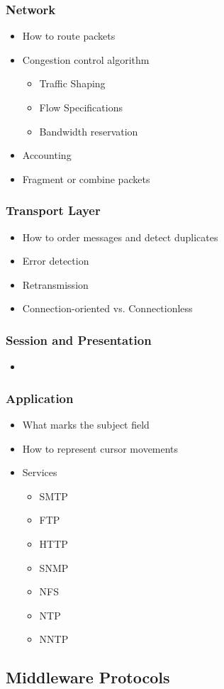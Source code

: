 \subsubsection{Network}\label{subsubsec:Network_Protocols}
\begin{itemize}
\item How to route packets
\item Congestion control algorithm
  \begin{itemize}
  \item Traffic Shaping
  \item Flow Specifications
  \item Bandwidth reservation
  \end{itemize}
\item Accounting
\item Fragment or combine packets
\end{itemize}

\subsubsection{Transport Layer}\label{subsubsec:Transport_Layer_Protocols}
\begin{itemize}
\item How to order messages and detect duplicates
\item Error detection
\item Retransmission
\item Connection-oriented vs. Connectionless
\end{itemize}

\subsubsection{Session and Presentation}\label{subsubsec:Session_Presentation_Protocols}
\begin{itemize}
\item
\end{itemize}

\subsubsection{Application}\label{subsubsec:Application_Protocols}
\begin{itemize}
\item What marks the subject field
\item How to represent cursor movements
\item Services
  \begin{itemize}
  \item SMTP
  \item FTP
  \item HTTP
  \item SNMP
  \item NFS
  \item NTP
  \item NNTP
  \end{itemize}
\end{itemize}

\subsection{Middleware Protocols}\label{subsubsec:Middleware_Protocols}

